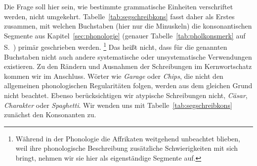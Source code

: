 Die Frage soll hier sein, wie bestimmte grammatische Einheiten verschriftet werden, nicht umgekehrt.
Tabelle~\ref{tab:segschreibkons} fasst daher als Erstes zusammen, mit welchen Buchstaben (hier nur die Minuskeln) die konsonantischen Segmente aus Kapitel~\ref{sec:phonologie} (genauer Tabelle~\ref{tab:pholkonsmerk} auf S.~\pageref{tab:pholkonsmerk}) primär geschrieben werden.%
\footnote{Während in der Phonologie die Affrikaten weitgehend unbeachtet blieben, weil ihre phonologische Beschreibung zusätzliche Schwierigkeiten mit sich bringt, nehmen wir sie hier als eigenständige Segmente auf.}
Das heißt nicht, dass für die genannten Buchstaben nicht auch andere systematische oder unsystematische Verwendungen existieren.
Zu den Rändern und Ausnahmen der Schreibungen im Kernwortschatz kommen wir im Anschluss.
Wörter wie \textit{Garage} oder \textit{Chips}, die nicht den allgemeinen phonologischen Regularitäten folgen, werden aus dem gleichen Grund nicht beachtet.
Ebenso berücksichtigen wir atypische Schreibungen nicht, \zB \textit{Cäsar}, \textit{Charakter} oder \textit{Spaghetti}.
Wir wenden uns mit Tabelle~\ref{tab:segschreibkons} zunächst den Konsonanten zu.

